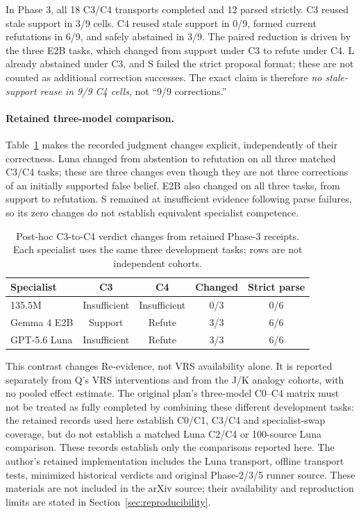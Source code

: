 \documentclass[11pt]{article}
\begin{document}
In Phase 3, all 18 C3/C4 transports completed and 12 parsed strictly.  C3 reused stale support in 3/9 cells.  C4 reused stale support in 0/9, formed current refutations in 6/9, and safely abstained in 3/9.  The paired reduction is driven by the three E2B tasks, which changed from support under C3 to refute under C4.  L already abstained under C3, and S failed the strict proposal format; these are not counted as additional correction successes.  The exact claim is therefore \emph{no stale-support reuse in 9/9 C4 cells}, not ``9/9 corrections.''

\paragraph{Retained three-model comparison.}
Table~\ref{tab:specialist-changes} makes the recorded judgment changes explicit, independently of their correctness. Luna changed from abstention to refutation on all three matched C3/C4 tasks; these are three changes even though they are not three corrections of an initially supported false belief. E2B also changed on all three tasks, from support to refutation. S remained at insufficient evidence following parse failures, so its zero changes do not establish equivalent specialist competence.

\begin{table}[ht]
\centering
\caption{Post-hoc C3-to-C4 verdict changes from retained Phase-3 receipts. Each specialist uses the same three development tasks; rows are not independent cohorts.}
\label{tab:specialist-changes}
\begin{tabular}{lcccc}
\toprule
Specialist & C3 & C4 & Changed & Strict parse \\
\midrule
135.5M & Insufficient & Insufficient & 0/3 & 0/6 \\
Gemma 4 E2B & Support & Refute & 3/3 & 6/6 \\
GPT-5.6 Luna & Insufficient & Refute & 3/3 & 6/6 \\
\bottomrule
\end{tabular}
\end{table}

This contrast changes Re-evidence, not VRS availability alone. It is reported separately from Q's VRS interventions and from the J/K analogy cohorts, with no pooled effect estimate. The original plan's three-model C0--C4 matrix must not be treated as fully completed by combining these different development tasks: the retained records used here establish C0/C1, C3/C4 and specialist-swap coverage, but do not establish a matched Luna C2/C4 or 100-source Luna comparison. These records establish only the comparisons reported here. The author's retained implementation includes the Luna transport, offline transport tests, minimized historical verdicts and original Phase-2/3/5 runner source. These materials are not included in the arXiv source; their availability and reproduction limits are stated in Section~\ref{sec:reproducibility}.
\end{document}
